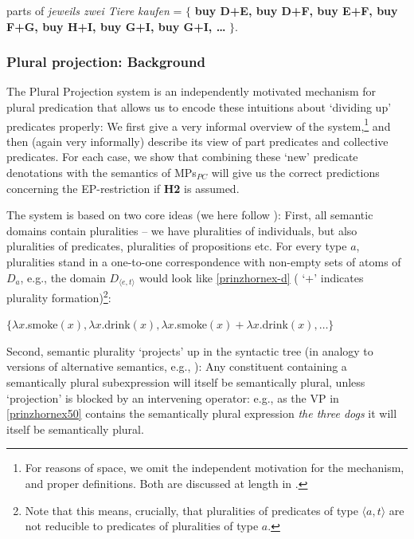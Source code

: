 \documentclass[output=paper,colorlinks,citecolor=brown,
]{langscibook}
\begin{document}
\ea 
 parts of \textit{jeweils zwei Tiere kaufen} = $\{$ \textbf{buy D+E, buy D+F, buy E+F,  buy F+G, buy H+I, buy G+I, buy G+I, \dots} $\}$.\label{prinzhornex46c}
\z










\subsubsection{Plural projection: Background}\label{prinzhornsec:4.2.1}

The Plural Projection system \citep{Schmitt:2019, Haslinger:2018a, Haslinger:2018b} is an independently motivated mechanism for plural predication that allows us to encode these intuitions about `dividing up' predicates properly: We first give a very informal overview of the system,\footnote{For reasons of space, we omit the independent motivation for the mechanism, and proper definitions. Both are discussed at length in \citealt{Schmitt:2019, Haslinger:2018a, Haslinger:2018b}.} and then (again very informally) describe its view of part predicates and collective predicates. For each case, we show that combining these `new' predicate denotations with the semantics of MPs$_{PC}$ will give us the correct predictions concerning the EP-restriction if \textbf{H2} is assumed.



The system  is based on two core ideas (we here follow \cite{Haslinger:2018b}): First, all semantic domains contain pluralities -- we have pluralities of individuals, but also pluralities of predicates, pluralities of propositions etc. For every type $a$, pluralities stand in a one-to-one correspondence with non-empty sets of atoms of $D_{a}$, e.g., the domain $D_{\langle e,t \rangle}$ would look like \ref{prinzhornex-d} ( `+'  indicates plurality formation)\footnote{Note that this means, crucially, that pluralities of predicates of type $\langle a,t \rangle$ are not reducible to predicates of  pluralities of type $a$.}: 



\ea	 $\{ \lambda x. $smoke$(x), \lambda x. $drink$(x), \lambda x. $smoke$(x) + \lambda x.  $drink$(x), \dots\}$ \label{prinzhornex-d} \z

Second, semantic plurality `projects' up in the syntactic tree (in analogy to versions of alternative semantics, e.g., \citealt{Rooth:1985}):
 Any constituent containing a semantically plural subexpression will itself be semantically plural, unless `projection'  is blocked by an intervening operator: e.g., as the VP in \ref{prinzhornex50} contains the semantically plural expression \textit{the three dogs} it will itself be semantically plural.
 
\end{document}
